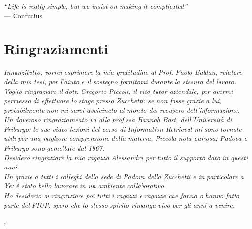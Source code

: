 
\cleardoublepage
{}
{}

\begin{flushright}{
	\slshape    
	``Life is really simple, but we insist on making it complicated''} \\ 
	\medskip
    --- Confucius
\end{flushright}


\bigskip

\begingroup
\let\clearpage\relax
\let\cleardoublepage\relax
\let\cleardoublepage\relax

\chapter*{Ringraziamenti}

\noindent \textit{Innanzitutto, vorrei esprimere la mia gratitudine al Prof. Paolo Baldan, relatore della mia tesi, per l'aiuto e il sostegno fornitomi durante la stesura del lavoro.}\\

\noindent \textit{Voglio ringraziare il dott. Gregorio Piccoli, il mio tutor aziendale, per avermi permesso di effettuare lo stage presso Zucchetti: se non fosse grazie a lui, probabilmente non mi sarei avvicinato al mondo del recupero dell'informazione.} \\

\noindent \textit{Un doveroso ringraziamento va alla prof.ssa Hannah Bast, dell'Università di Friburgo: le sue video lezioni del corso di Information Retrieval mi sono tornate utili per una migliore comprensione della materia. Piccola nota curiosa: Padova e Friburgo sono gemellate dal 1967.}\\

\noindent \textit{Desidero ringraziare la mia ragazza Alessandra per tutto il supporto dato in questi anni.}\\

\noindent \textit{Un grazie a tutti i colleghi della sede di Padova della Zucchetti e in particolare a Ye: è stato bello lavorare in un ambiente collaborativo.}\\

\noindent \textit{Ho desiderio di ringraziare poi tutti i ragazzi e ragazze che fanno o hanno fatto parte del FIUP: spero che lo stesso spirito rimanga vivo per gli anni a venire.}\\
\bigskip

\noindent\textit{\myLocation, \myTime}
\hfill \myName

\endgroup

